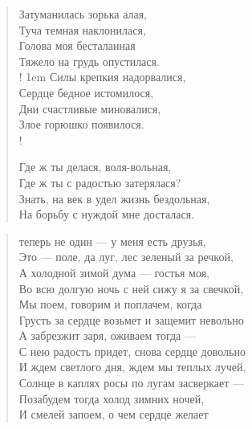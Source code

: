 \begin{verse}
Затуманилась зорька алая,\\
Туча темная наклонилася,\\
Голова моя бесталанная\\
Тяжело на грудь опустилася.\\!
\begingroup
\leftskip1em
\rightskip\leftskip
    Силы крепкия  надорвалися,\\
    Сердце бедное истомилося,\\
    Дни счастливые миновалися,\\
    Злое горюшко появилося.\\!
\endgroup

Где ж ты делася, воля-вольная,\\
Где ж ты с радостью затерялася?\\
Знать, на век в удел жизнь бездольная,\\
На борьбу с нуждой мне досталася.
\end{verse}


\newpage
\vspace*{0cm}

\begin{verse}
\begin{patverse*}
 теперь не один --- у меня есть друзья,\\
Это --- поле, да луг, лес зеленый за речкой,\\
    А холодной зимой дума --- гостья моя,\\
Во всю долгую ночь с ней сижу я за свечкой,\\
    Мы поем, говорим и поплачем, когда\\
Грусть за сердце возьмет и защемит невольно\ldotst\\
    А забрезжит заря, оживаем тогда ---\\
С нею радость придет, снова сердце довольно\ldotst\\
    И ждем светлого дня, ждем мы теплых лучей,\\
Солнце в каплях росы по лугам засверкает ---\\
    Позабудем тогда холод зимних ночей,\\
И смелей запоем, о чем сердце желает\ldotst
\end{patverse*}
\end{verse}


